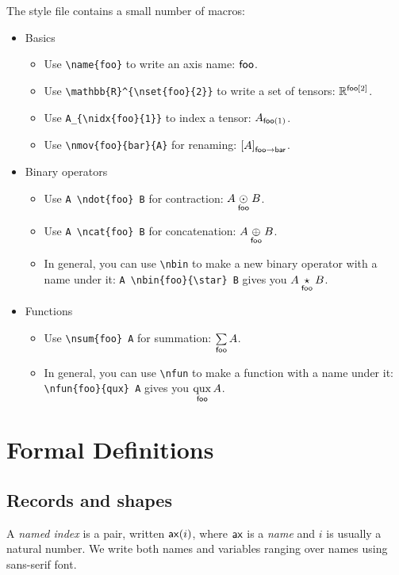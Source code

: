 \documentclass{article}
\begin{document}
The style file contains a small number of macros:
\begin{itemize}
\item Basics
  \begin{itemize}
  \item Use \verb|\name{foo}| to write an axis name: $\name{foo}$.
  \item Use \verb|\mathbb{R}^{\nset{foo}{2}}| to write a set of tensors: $\mathbb{R}^{\nset{foo}{2}}$.
  \item Use \verb|A_{\nidx{foo}{1}}| to index a tensor: $A_{\nidx{foo}{1}}$.
  \item Use \verb|\nmov{foo}{bar}{A}| for renaming: $\nmov{foo}{bar}{A}$.
  \end{itemize}
\item Binary operators
  \begin{itemize}
  \item Use \verb|A \ndot{foo} B| for contraction: $A \ndot{foo} B$.
  \item Use \verb|A \ncat{foo} B| for concatenation: $A \ncat{foo} B$.
  \item In general, you can use \verb|\nbin| to make a new binary operator with a name under it: \verb|A \nbin{foo}{\star} B| gives you $A \nbin{foo}{\star} B$.
  \end{itemize}
\item Functions
  \begin{itemize}
  \item Use \verb|\nsum{foo} A| for summation: $\nsum{foo} A$.
  \item In general, you can use \verb|\nfun| to make a function with a name under it: \verb|\nfun{foo}{qux} A| gives you $\nfun{foo}{qux} A$.
  \end{itemize}
\end{itemize}

\section{Formal Definitions}
\label{sec:definitions}

\newcommand{\sub}[1]{_\text{$#1$}}

\subsection{Records and shapes}

A \emph{named index} is a pair, written $\nidx{ax}{i}$, where $\name{ax}$ is a \emph{name} and $i$ is usually a natural number. We write both names and variables ranging over names using sans-serif font.
\end{document}
